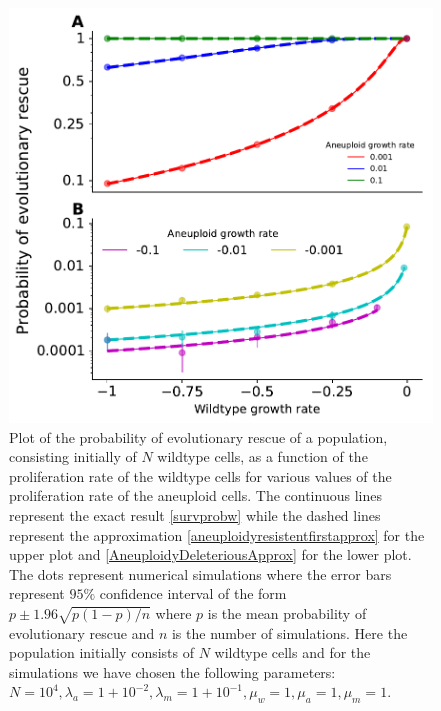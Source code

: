 \documentclass[12pt]{extarticle}
\begin{document}
\begin{figure}[!t]
 \vspace*{1\baselineskip}
\includegraphics[width=1\textwidth]{Figures/CombinedSubplot.pdf}
\caption{Plot of the probability of evolutionary rescue of a population, consisting initially of $N$ wildtype cells, as a function of the proliferation rate of the wildtype cells for various values of the proliferation rate of the aneuploid cells. The continuous lines represent the exact result \eqref{survprobw} while the dashed lines represent the approximation \eqref{aneuploidyresistentfirstapprox} for the upper plot and \eqref{AneuploidyDeleteriousApprox} for the lower plot. The dots represent numerical simulations where the error bars represent $95\%$ confidence interval of the form $p\pm1.96\sqrt{p\left(1-p\right)/n}$ where $p$ is the mean probability of evolutionary rescue and $n$ is the number of simulations. Here the population initially consists of $N$ wildtype cells and for the simulations we have chosen the following parameters: $N=10^4, \lambda_a=1+10^{-2},\lambda_m=1+10^{-1},\mu_w=1,\mu_a=1,\mu_m=1$. }
\label{SurvPlot}
\end{figure}
\end{document}
